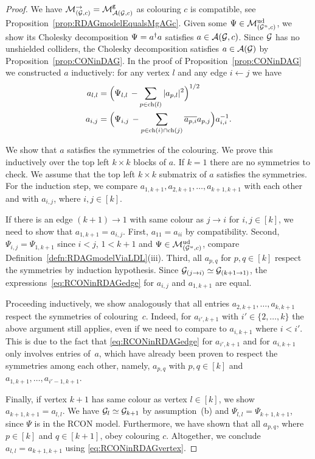 \begin{proof} 
	We have $\mathcal{M}_{(\mathcal{G}, c)}^{\to} = \mathcal{M}^{\mathtt{g}}_{\mathcal{A}(\mathcal{G}, c)}$ as colouring $c$ is compatible, see Proposition~\ref{prop:RDAGmodelEqualsMgAGc}.
	Given some $\Psi \in \mathcal{M}^{\mathrm{ud}}_{(\mathcal{G}^u,c)}$, we show its Cholesky decomposition $\Psi = a^{\dagger} a$ satisfies $a \in \mathcal{A}(\mathcal{G}, c)$.
	Since $\mathcal{G}$ has no unshielded colliders, the Cholesky decomposition satisfies $a \in \mathcal{A}(\mathcal{G})$ by Proposition~\ref{prop:CONinDAG}. In the proof of Proposition~\ref{prop:CONinDAG} we constructed %
	$a$ inductively: for any vertex $l$ and any edge $i \leftarrow j$ we have
	\begin{align} %
		a_{l,l} &= \Big( \Psi_{l,l} \, - \sum_{p \in {\ch}(l)} |a_{p,l}|^2 \Big)^{1/2} \label{eq:RCONinRDAGvertex} \\
		a_{i,j} &= \Big( \Psi_{i,j} \, - \sum_{p \in {\ch}(i) \cap {\ch}(j)} \overline{a_{p,i}} a_{p,j} \Big) a_{i,i}^{-1}. \label{eq:RCONinRDAGedge}
	\end{align}
	
	We show that $a$ satisfies the symmetries of the colouring.
	We prove this inductively over the top left $k \times k$ blocks of $a$.
	If $k=1$ there are no symmetries to check.
	We assume that the top left $k \times k$ submatrix of $a$ satisfies the symmetries. For the induction step, we compare $a_{1,k+1},a_{2,k+1},\ldots,a_{k+1,k+1}$ with each other and with $a_{i,j}$, where $i,j \in [k]$.
	
	If there is an edge $(k+1) \to 1$ with same colour as $j \to i$ for $i,j \in [k]$, we
	need to show that $a_{1,k+1} = a_{i,j}$.
	First, $a_{11} = a_{ii}$ by compatibility. Second, $\Psi_{i,j} = \Psi_{1,k+1}$ since $i<j$, $1 < k+1$ and $\Psi \in \mathcal{M}^{\mathrm{ud}}_{(\mathcal{G}^u, c)}$, compare Definition~\ref{defn:RDAGmodelViaLDL}(iii). Third, all $a_{p,q}$ for $p,q \in [k]$ respect the symmetries by induction hypothesis. Since $\mathcal{G}_{(j \to i)} \simeq \mathcal{G}_{(k+1 \to 1)}$, the expressions~\eqref{eq:RCONinRDAGedge} for $a_{i,j}$ and $a_{1,k+1}$ are equal. %
	
	Proceeding inductively, we show analogously that all entries $a_{2,k+1},\ldots,a_{k,k+1}$ respect the symmetries of colouring~$c$. Indeed, for $a_{i',k+1}$ with $i' \in \{2,\ldots,k\}$ the above argument still applies, even if we need to compare to $a_{i,k+1}$ where $i < i'$. This is due to the fact that \eqref{eq:RCONinRDAGedge} for $a_{i',k+1}$ and for $a_{i,k+1}$ only involves entries of~$a$, which have already been proven to respect the symmetries among each other, namely, $a_{p,q}$ with $p,q \in [k]$ and $a_{1,k+1}, \ldots, a_{i'-1,k+1}$.
	
	Finally, if vertex $k+1$ has same colour as vertex $l \in [k]$, we show $a_{k+1,k+1} = a_{l,l}$. We have $\mathcal{G}_l \simeq \mathcal{G}_{k+1}$ by assumption~(b) and $\Psi_{l,l} = \Psi_{k+1,k+1}$, since $\Psi$ is in the RCON model. Furthermore, we have shown that all $a_{p,q}$, where $p \in [k]$ and $q \in [k+1]$, obey colouring $c$. Altogether, we conclude $a_{l,l} = a_{k+1,k+1}$ using \eqref{eq:RCONinRDAGvertex}.
\end{proof}


